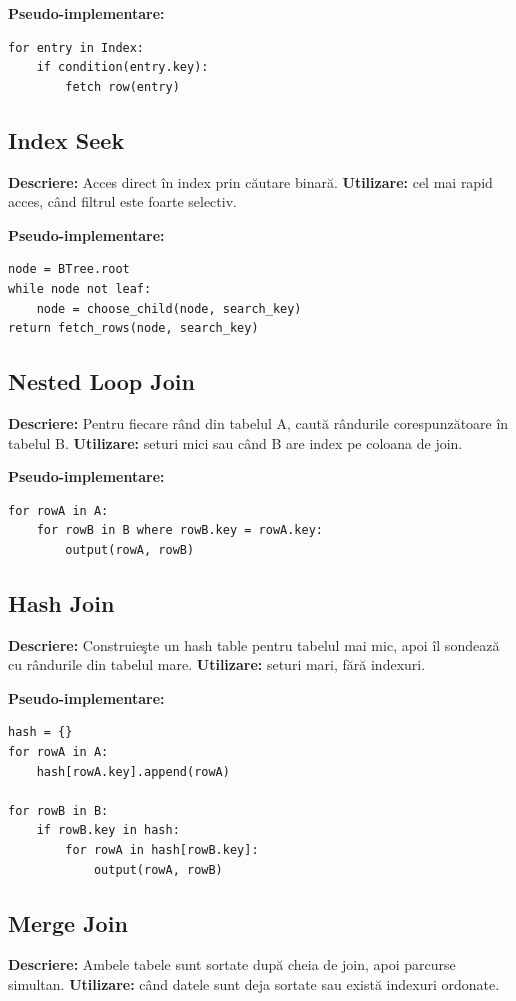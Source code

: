 \documentclass[12pt]{article}
\begin{document}
\textbf{Pseudo-implementare:}
\begin{verbatim}
for entry in Index:
    if condition(entry.key):
        fetch row(entry)
\end{verbatim}

\subsection{Index Seek}
\textbf{Descriere:} Acces direct în index prin căutare binară.  
\textbf{Utilizare:} cel mai rapid acces, când filtrul este foarte selectiv.

\textbf{Pseudo-implementare:}
\begin{verbatim}
node = BTree.root
while node not leaf:
    node = choose_child(node, search_key)
return fetch_rows(node, search_key)
\end{verbatim}

\subsection{Nested Loop Join}
\textbf{Descriere:} Pentru fiecare rând din tabelul A, caută rândurile corespunzătoare în tabelul B.  
\textbf{Utilizare:} seturi mici sau când B are index pe coloana de join.

\textbf{Pseudo-implementare:}
\begin{verbatim}
for rowA in A:
    for rowB in B where rowB.key = rowA.key:
        output(rowA, rowB)
\end{verbatim}

\subsection{Hash Join}
\textbf{Descriere:} Construieşte un hash table pentru tabelul mai mic, apoi îl sondează cu rândurile din tabelul mare.  
\textbf{Utilizare:} seturi mari, fără indexuri.

\textbf{Pseudo-implementare:}
\begin{verbatim}
hash = {}
for rowA in A:
    hash[rowA.key].append(rowA)

for rowB in B:
    if rowB.key in hash:
        for rowA in hash[rowB.key]:
            output(rowA, rowB)
\end{verbatim}

\subsection{Merge Join}
\textbf{Descriere:} Ambele tabele sunt sortate după cheia de join, apoi parcurse simultan.  
\textbf{Utilizare:} când datele sunt deja sortate sau există indexuri ordonate.
\end{document}
